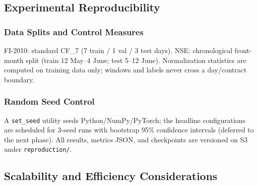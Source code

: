 \documentclass[11pt]{article}
\begin{document}
\subsection{Experimental Reproducibility}
\subsubsection{Data Splits and Control Measures}
FI-2010: standard CF\_7 (7 train / 1 val / 3 test days). NSE: chronological front-month split (train
12 May--4 June; test 5--12 June). Normalization statistics are computed on training data only; windows and
labels never cross a day/contract boundary.
\subsubsection{Random Seed Control}
A \texttt{set\_seed} utility seeds Python/NumPy/PyTorch; the headline configurations are scheduled for
3-seed runs with bootstrap 95\% confidence intervals (deferred to the next phase). All results, metrics
JSON, and checkpoints are versioned on S3 under \texttt{reproduction/}.

\subsection{Scalability and Efficiency Considerations}
\end{document}
